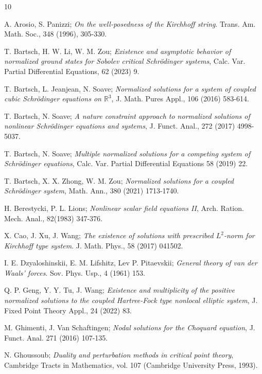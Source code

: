 \documentclass[reqno]{amsart}
\begin{document}
\begin{thebibliography}{10}

 A. Arosio, S. Panizzi;
\emph{On the well-posedness of the Kirchhoff string}. 
Trans. Am. Math. Soc., 348 (1996), 305-330.

 T. Bartsch, H. W. Li, W. M. Zou;
\emph{Existence and asymptotic behavior of normalized ground states for Sobolev
critical Schr\"{o}dinger systems}, Calc. Var. Partial Differential Equations, 62 (2023) 9.


 T. Bartsch, L. Jeanjean, N. Soave;
\emph{Normalized solutions for a system of coupled cubic Schr\"{o}dinger equations
on $\mathbb{R}^3$}, J. Math. Pures Appl., 106 (2016) 583-614.

 T. Bartsch, N. Soave;
\emph{A nature constraint approach to normalized solutions of nonlinear 
Schr\"{o}dinger equations and systems}, J. Funct. Anal., 272 (2017) 4998-5037.

 T. Bartsch, N. Soave;
\emph{Multiple normalized solutions for a competing system of Schr\"{o}dinger equations},
 Calc. Var. Partial Differential Equations 58 (2019) 22.

 T. Bartsch, X. X. Zhong, W. M. Zou;
\emph{Normalized solutions for a coupled Schr\"{o}dinger system}, Math. Ann.,
380 (2021) 1713-1740.

 H. Berestycki, P. L. Lions;
\emph{Nonlinear scalar field equations II},
 Arch. Ration. Mech. Anal., 82(1983) 347-376.

 X. Cao, J. Xu, J. Wang;
\emph{The existence of solutions with prescribed $L^2$-norm for Kirchhoff type system}. 
J. Math. Phys., 58 (2017) 041502.

 I. E. Dzyaloshinskii, E. M. Lifshitz, Lev P. Pitaevskii;
\emph{General theory of van der Waals' forces}. Sov. Phys. Usp., 4 (1961) 153.

 Q. P. Geng, Y. Y. Tu, J. Wang;
\emph{Existence and multiplicity of the positive normalized solutions to the
coupled Hartree-Fock type nonlocal elliptic system}, 
J. Fixed Point Theory Appl., 24 (2022) 83.

 M. Ghimenti, J. Van Schaftingen;
\emph{Nodal solutions for the Choquard equation}, J. Funct. Anal. 271
(2016) 107-135.

 N. Ghoussoub;
\emph{Duality and perturbation methods in critical point theory}, Cambridge Tracts
in Mathematics, vol. 107 (Cambridge University Press, 1993).


\end{thebibliography}
\end{document}

